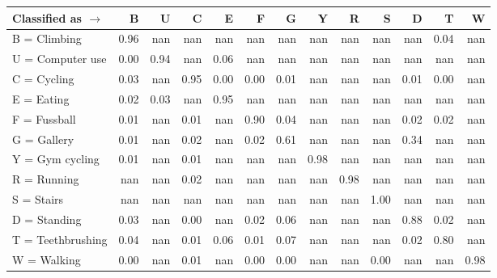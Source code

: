 \begin{tabular}{lrrrrrrrrrrrr}
\toprule
Classified as $\rightarrow$ &    B &    U &    C &    E &    F &    G &    Y &    R &    S &    D &    T &    W \\
\midrule
B = Climbing      & 0.96 &  nan &  nan &  nan &  nan &  nan &  nan &  nan &  nan &  nan & 0.04 &  nan \\
U = Computer use  & 0.00 & 0.94 &  nan & 0.06 &  nan &  nan &  nan &  nan &  nan &  nan &  nan &  nan \\
C = Cycling       & 0.03 &  nan & 0.95 & 0.00 & 0.00 & 0.01 &  nan &  nan &  nan & 0.01 & 0.00 &  nan \\
E = Eating        & 0.02 & 0.03 &  nan & 0.95 &  nan &  nan &  nan &  nan &  nan &  nan &  nan &  nan \\
F = Fussball      & 0.01 &  nan & 0.01 &  nan & 0.90 & 0.04 &  nan &  nan &  nan & 0.02 & 0.02 &  nan \\
G = Gallery       & 0.01 &  nan & 0.02 &  nan & 0.02 & 0.61 &  nan &  nan &  nan & 0.34 &  nan &  nan \\
Y = Gym cycling   & 0.01 &  nan & 0.01 &  nan &  nan &  nan & 0.98 &  nan &  nan &  nan &  nan &  nan \\
R = Running       &  nan &  nan & 0.02 &  nan &  nan &  nan &  nan & 0.98 &  nan &  nan &  nan &  nan \\
S = Stairs        &  nan &  nan &  nan &  nan &  nan &  nan &  nan &  nan & 1.00 &  nan &  nan &  nan \\
D = Standing      & 0.03 &  nan & 0.00 &  nan & 0.02 & 0.06 &  nan &  nan &  nan & 0.88 & 0.02 &  nan \\
T = Teethbrushing & 0.04 &  nan & 0.01 & 0.06 & 0.01 & 0.07 &  nan &  nan &  nan & 0.02 & 0.80 &  nan \\
W = Walking       & 0.00 &  nan & 0.01 &  nan & 0.00 & 0.00 &  nan &  nan & 0.00 &  nan &  nan & 0.98 \\
\bottomrule
\end{tabular}
